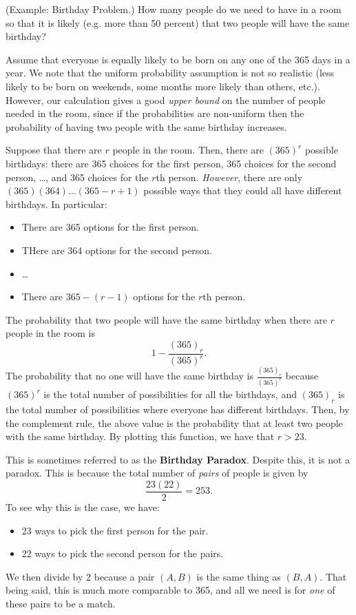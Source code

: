 \begin{mdframed}[]
    (Example: Birthday Problem.) How many people do we need to have in a room so that it is likely (e.g. more than 50 percent) that two people will have the same birthday? 

    \bigskip 

    Assume that everyone is equally likely to be born on any one of the 365 days in a year. We note that the uniform probability assumption is not so realistic (less likely to be born on weekends, some months more likely than others, etc.). However, our calculation gives a good \emph{upper bound} on the number of people needed in the room, since if the probabilities are non-uniform then the probability of having two people with the same birthday increases. 

    \bigskip 

    Suppose that there are $r$ people in the room. Then, there are $(365)^r$ possible birthdays: there are 365 choices for the first person, 365 choices for the second person, \dots, and 365 choices for the $r$th person. \emph{However}, there are only $(365)(364) \dots (365 - r + 1)$ possible ways that they could all have different birthdays. In particular: 
    \begin{itemize}
        \item There are 365 options for the first person. 
        \item THere are 364 options for the second person. 
        \item \dots 
        \item There are $365 - (r - 1)$ options for the $r$th person. 
    \end{itemize}
    The probability that two people will have the same birthday when there are $r$ people in the room is 
    \[1 - \frac{(365)_r}{(365)^r}.\]
    The probability that no one will have the same birthday is $\frac{(365)_r}{(365)^r}$ because $(365)^r$ is the total number of possibilities for all the birthdays, and $(365)_r$ is the total number of possibilities where everyone has different birthdays. Then, by the complement rule, the above value is the probability that at least two people with the same birthday. By plotting this function, we have that $r > 23$. 

    \bigskip 

    This is sometimes referred to as the \textbf{Birthday Paradox}. Despite this, it is not a paradox. This is because the total number of \emph{pairs} of people is given by 
    \[\frac{23(22)}{2} = 253.\]
    To see why this is the case, we have: 
    \begin{itemize}
        \item 23 ways to pick the first person for the pair. 
        \item 22 ways to pick the second person for the pairs. 
    \end{itemize}
    We then divide by 2 because a pair $(A, B)$ is the same thing as $(B, A)$. That being said, this is much more comparable to 365, and all we need is for \emph{one} of these pairs to be a match. 
\end{mdframed}

